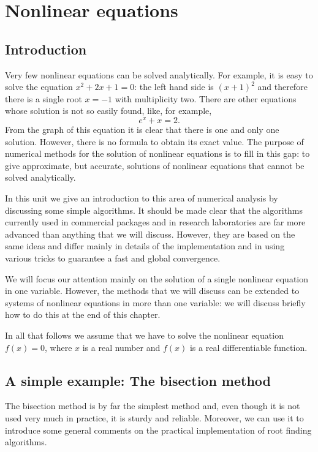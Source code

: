 
\chapter[Nonlinear equations]{Nonlinear equations}

\section{Introduction}

Very few nonlinear equations can be solved analytically.  For example,
it is easy to solve the  equation $x^2+2 x  + 1=0$: the left hand side
is   $(x+1)^2$ and  therefore there  is   a  single  root $x=-1$  with
multiplicity two.  There are other equations whose  solution is not so
easily found, like, for example,
%
\begin{equation*}
 e^x + x = 2 .
\end{equation*}
%
From the graph of this equation it is clear that there is one and only
one solution.  However, there is no formula to obtain its exact value.
The   purpose of  numerical   methods  for  the solution of  nonlinear
equations is to  fill in this gap: to  give approximate, but accurate,
solutions of nonlinear equations that cannot be solved analytically.

In this unit we give an introduction to this area of numerical
analysis by discussing some simple algorithms.  It should be made
clear that the algorithms currently used in commercial packages and in
research laboratories are far more advanced than anything that we will
discuss.  However, they are based on the same ideas and differ mainly
in details of the implementation and in using various tricks to
guarantee a fast and global convergence.

We will  focus   our attention  mainly  on  the solution  of  a single
nonlinear equation in one variable.  However, the methods that we will
discuss can be extended to systems of nonlinear equations in more than
one  variable: we will discuss  briefly how to do this  at  the end of
this chapter.

In all that follows we assume that we have to solve the nonlinear
equation $f(x) = 0$, where $x$ is a real number and $f(x)$ is a real
differentiable function.

\section{A simple example: The bisection method}

The bisection method is by far the simplest method and, even though it
is not used very much in practice, it is sturdy and reliable.
Moreover, we can use it to introduce some general comments on the
practical implementation of root finding algorithms.

